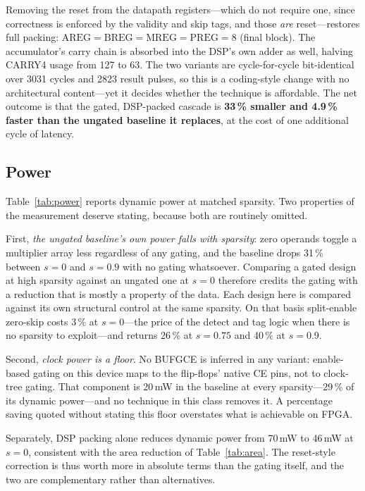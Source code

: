 \documentclass[journal,twocolumn]{IEEEtran}
\begin{document}
Removing the reset from the datapath registers---which do not require one,
since correctness is enforced by the validity and skip tags, and those
\emph{are} reset---restores full packing: $\mathrm{AREG}=\mathrm{BREG}=
\mathrm{MREG}=\mathrm{PREG}=8$ (final block). The accumulator's carry chain is
absorbed into the DSP's own adder as well, halving CARRY4 usage from 127 to
63. The two variants are cycle-for-cycle bit-identical over 3031 cycles and
2823 result pulses, so this is a coding-style change with no architectural
content---yet it decides whether the technique is affordable. The net outcome
is that the gated, DSP-packed cascade is \textbf{33\,\% smaller and 4.9\,\%
faster than the ungated baseline it replaces}, at the cost of one additional
cycle of latency.

\subsection{Power}
Table~\ref{tab:power} reports dynamic power at matched sparsity. Two
properties of the measurement deserve stating, because both are routinely
omitted.

First, \emph{the ungated baseline's own power falls with sparsity}: zero
operands toggle a multiplier array less regardless of any gating, and the
baseline drops 31\,\% between $s=0$ and $s=0.9$ with no gating whatsoever.
Comparing a gated design at high sparsity against an ungated one at $s=0$
therefore credits the gating with a reduction that is mostly a property of the
data. Each design here is compared against its own structural control at the
same sparsity. On that basis split-enable zero-skip costs 3\,\% at $s=0$---the
price of the detect and tag logic when there is no sparsity to exploit---and
returns 26\,\% at $s=0.75$ and 40\,\% at $s=0.9$.

Second, \emph{clock power is a floor}. No BUFGCE is inferred in any variant:
enable-based gating on this device maps to the flip-flops' native CE pins, not
to clock-tree gating. That component is 20\,mW in the baseline at every
sparsity---29\,\% of its dynamic power---and no technique in this class
removes it. A percentage saving quoted without stating this floor overstates
what is achievable on FPGA.

Separately, DSP packing alone reduces dynamic power from 70\,mW to 46\,mW at
$s=0$, consistent with the area reduction of Table~\ref{tab:area}. The
reset-style correction is thus worth more in absolute terms than the gating
itself, and the two are complementary rather than alternatives.
\end{document}
